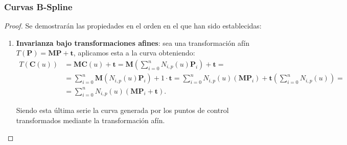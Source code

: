 \documentclass[11pt]{book}
\theoremstyle{plain} %
\theoremstyle{definition} %
\theoremstyle{definition} %
\begin{document}
\subsubsection{Curvas B-Spline}
\begin{proof} Se demostrarán las propiedades en el orden en el que han sido establecidas:
    \begin{enumerate}
            \item \textbf{Invarianza bajo transformaciones afines}: sea una transformación afín $T(\mathbf{P}) = \mathbf{M} \mathbf{P} + \mathbf{t}$, aplicamos esta a la curva obteniendo:
            \begin{align*}
                    T(\mathbf{C}(u)) &= \mathbf{M} \mathbf{C}(u) + \mathbf{t} = \mathbf{M} \left( \sum_{i=0}^{n} N_{i,p}(u) \mathbf{P}_i \right) + \mathbf{t} =\\
                                     &=  \sum_{i=0}^{n} \mathbf{M} (N_{i,p}(u) \mathbf{P}_i) + 1 \cdot \mathbf{t} = \sum_{i=0}^{n} N_{i,p}(u) (\mathbf{M} \mathbf{P}_i) + \mathbf{t} \left( \sum_{i=0}^{n} N_{i,p}(u) \right)=\\
                                     &= \sum_{i=0}^{n} N_{i,p}(u) (\mathbf{M} \mathbf{P}_i + \mathbf{t}).
            \end{align*}

            Siendo esta última serie la curva generada por los puntos de control transformados mediante la transformación afín.
            

\end{enumerate}
\end{proof}
\end{document}
